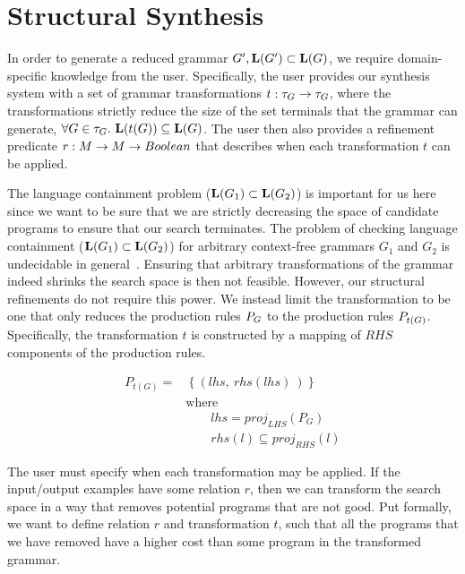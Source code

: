 \section{Structural Synthesis}
\label{sec:struct}
In order to generate a reduced grammar $G', \mathbf{L}(G') \subset \mathbf{L}(G)$, we require domain-specific knowledge from the user.
Specifically, the user provides our synthesis system with a set of grammar transformations \mbox{$t: \tau_{G} \to \tau_{G}$}, where the transformations strictly reduce the size of the set terminals that the grammar can generate, \mbox{$\forall G \in \tau_{G}. \ \mathbf{L}(t(G)) \subseteq \mathbf{L}(G)$}.
The user then also provides a refinement predicate $r: M \to M \to Boolean$ that describes when each transformation $t$ can be applied. 

The language containment problem ($\mathbf{L}(G_{1}) \subset \mathbf{L}(G_{2})$) is important for us here since we want to be sure that we are strictly decreasing the space of candidate programs to ensure that our search terminates.
The problem of checking language containment ($\mathbf{L}(G_{1}) \subset \mathbf{L}(G_{2})$) for arbitrary context-free grammars $G_1$ and $G_2$ is undecidable in general~\cite{hopcroft1969equivalence}.
Ensuring that arbitrary transformations of the grammar indeed shrinks the search space is then not feasible.
However, our structural refinements do not require this power.
We instead limit the transformation to be one that only reduces the production rules $P_G$ to the production rules $P_{t(G)}$.
Specifically, the transformation $t$ is constructed by a mapping of $RHS$ components of the production rules.

\begin{align*}
P_{t(G)} =& \ \{ \ (lhs,\ rhs(lhs)\ )\  \} \\
&\text{where}\\
&\qquad lhs = proj_{LHS}(P_G) \\
&\qquad rhs(l) \subseteq proj_{RHS}(l) 
\end{align*}

The user must specify when each transformation may be applied.
If the input/output examples have some relation $r$, then we can transform the search space in a way that removes potential programs that are not good.
Put formally, we want to define relation $r$ and transformation $t$, such that all the programs that we have removed have a higher cost than some program in the transformed grammar.

